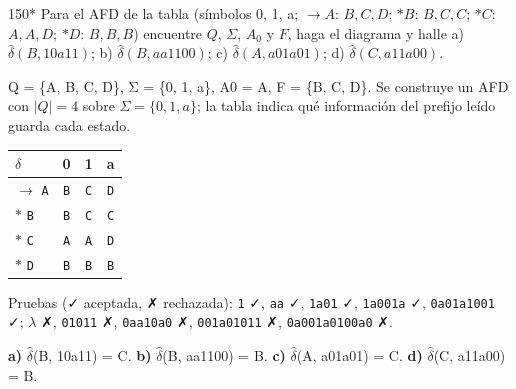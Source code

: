 \documentclass[11pt]{article}
\begin{document}
\begin{ejercicio}{150}{*}
Para el AFD de la tabla (símbolos 0, 1, a; $\to A$: $B, C, D$; $*B$: $B, C, C$; $*C$: $A, A, D$; $*D$: $B, B, B$) encuentre $Q$, $\Sigma$, $A_0$ y $F$, haga el diagrama y halle a) $\hat\delta(B, 10a11)$; b) $\hat\delta(B, aa1100)$; c) $\hat\delta(A, a01a01)$; d) $\hat\delta(C, a11a00)$.
\end{ejercicio}
\proc Q = \{A, B, C, D\}, Σ = \{0, 1, a\}, A0 = A, F = \{B, C, D\}. Se construye un AFD con $|Q| = 4$ sobre $\Sigma = \{0, 1, a\}$; la tabla indica qué información del prefijo leído guarda cada estado.
\begin{center}\small\begin{tabular}{lccc}\toprule
$\delta$ & 0 & 1 & a \\\midrule
$\to$ \texttt{A} & \texttt{B} & \texttt{C} & \texttt{D} \\
$*$ \texttt{B} & \texttt{B} & \texttt{C} & \texttt{C} \\
$*$ \texttt{C} & \texttt{A} & \texttt{A} & \texttt{D} \\
$*$ \texttt{D} & \texttt{B} & \texttt{B} & \texttt{B} \\
\bottomrule\end{tabular}\end{center}
Pruebas (✓ aceptada, ✗ rechazada): \texttt{1} ✓, \texttt{aa} ✓, \texttt{1a01} ✓, \texttt{1a001a} ✓, \texttt{0a01a1001} ✓; $\lambda$ ✗, \texttt{01011} ✗, \texttt{0aa10a0} ✗, \texttt{001a01011} ✗, \texttt{0a001a0100a0} ✗.


\textbf{a)} $\hat{\delta}$(B, 10a11) = C. \textbf{b)} $\hat{\delta}$(B, aa1100) = B. \textbf{c)} $\hat{\delta}$(A, a01a01) = C. \textbf{d)} $\hat{\delta}$(C, a11a00) = B.
\end{document}
